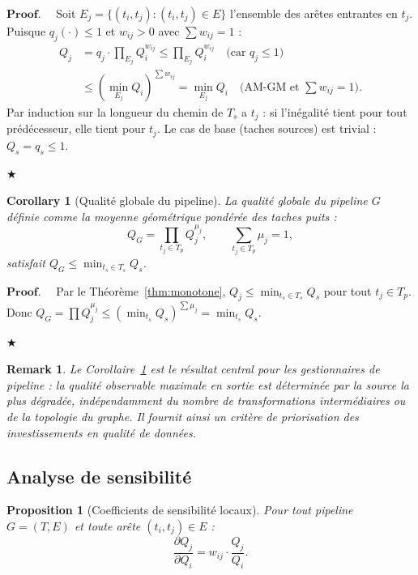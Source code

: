 \documentclass[12pt]{article}
\newtheorem{proposition}{Proposition}[section]
\newtheorem{corollary}[theorem]{Corollary}
\newtheorem{remark}{Remark}[section]
\newenvironment{proof}{$\mathbf{Proof.\quad}$}{\begin{flushright}$\bigstar$\end{flushright}}
\begin{document}
\begin{proof}
	Soit $E_j = \{(t_i,t_j) : (t_i,t_j)\in E\}$ l'ensemble des arêtes
	entrantes en $t_j$.
	Puisque $q_j(\cdot) \leq 1$ et $w_{ij} > 0$ avec $\sum w_{ij}=1$ :
	\begin{align*}
		Q_j &= q_j \cdot \prod_{E_j} Q_i^{w_{ij}}
		\leq \prod_{E_j} Q_i^{w_{ij}}
		\quad\text{(car } q_j \leq 1\text{)}\\
		&\leq \left(\min_{E_j} Q_i\right)^{\sum w_{ij}}
		= \min_{E_j} Q_i
		\quad\text{(AM-GM et }\textstyle\sum w_{ij}=1\text{)}.
	\end{align*}
	Par induction sur la longueur du chemin de $T_s$ a $t_j$ :
	si l'inégalité tient pour tout prédécesseur, elle tient pour $t_j$.
	Le cas de base (taches sources) est trivial : $Q_s = q_s \leq 1$.

\end{proof}

	\begin{corollary}[Qualité globale du pipeline]
	\label{cor:global}
	La qualité globale du pipeline $G$ définie comme la moyenne géométrique
	pondérée des taches puits :
	\begin{equation}
		Q_G = \prod_{t_j \in T_p} Q_j^{\mu_j},
		\qquad \sum_{t_j\in T_p}\mu_j = 1,
		\label{eq:qglobal}
	\end{equation}
	satisfait $Q_G \leq \min_{t_s \in T_s} Q_s$.
\end{corollary}

\begin{proof}
	Par le Théorème~\ref{thm:monotone}, $Q_j \leq \min_{t_s\in T_s} Q_s$
	pour tout $t_j \in T_p$. Donc
	$Q_G = \prod Q_j^{\mu_j} \leq (\min_{t_s}Q_s)^{\sum\mu_j}
	= \min_{t_s}Q_s$.
\end{proof}

\begin{remark}
	Le Corollaire~\ref{cor:global} est le résultat central pour les
	gestionnaires de pipeline : la qualité observable maximale en sortie
	est déterminée par la source la plus dégradée, indépendamment du nombre
	de transformations intermédiaires ou de la topologie du graphe.
	Il fournit ainsi un critère de priorisation des investissements en
	qualité de données.
\end{remark}
\subsection{Analyse de sensibilité}
\label{subsec:sensitivity}

\begin{proposition}[Coefficients de sensibilité locaux]
	\label{prop:sensitivity}
	Pour tout pipeline $G=(T,E)$ et toute arête $(t_i,t_j) \in E$ :
	\begin{equation}
		\frac{\partial Q_j}{\partial Q_i} = w_{ij} \cdot \frac{Q_j}{Q_i}.
		\label{eq:sens_local}
	\end{equation}
\end{proposition}
\end{document}
